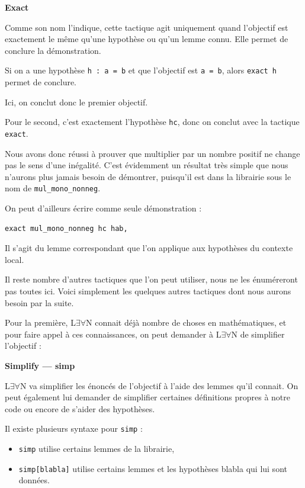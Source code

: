 \documentclass[a4paper, 11pt, twoside]{report}
\newcommand{\LEAN}{L$\exists\forall$N }
\begin{document}
\begin{tactic}
	\centerline{\bfseries Exact}
	
	Comme son nom l'indique, cette tactique agit uniquement quand l'objectif est exactement le même qu'une hypothèse ou qu'un lemme connu. Elle permet de conclure la démonstration.
	
	\tcblower
	
	Si on a une hypothèse \verb|h : a = b| et que l'objectif est \verb|a = b|, alors \verb|exact h| permet de conclure.
\end{tactic}

Ici, on conclut donc le premier objectif. 

Pour le second, c'est exactement l'hypothèse \verb|hc|, donc on conclut avec la tactique \verb|exact|.

\medskip

Nous avons donc réussi à prouver que multiplier par un nombre positif ne change pas le sens d'une inégalité. C'est évidemment un résultat très simple que nous n'aurons plus jamais besoin de démontrer, puisqu'il est dans la librairie sous le nom de \verb|mul_mono_nonneg|. 

On peut d'ailleurs écrire comme seule démonstration : 

\begin{lstlisting}
exact mul_mono_nonneg hc hab,
\end{lstlisting}

Il s'agit du lemme correspondant que l'on applique aux hypothèses du contexte local.

\medskip

Il reste nombre d'autres tactiques que l'on peut utiliser, nous ne les énuméreront pas toutes ici. Voici simplement les quelques autres tactiques dont nous aurons besoin par la suite.

\medskip

Pour la première, \LEAN connait déjà nombre de choses en mathématiques, et pour faire appel à ces connaissances, on peut demander à \LEAN de simplifier l'objectif :
\begin{tactic}
	\centerline{\bfseries Simplify --- simp}
	
	\LEAN va simplifier les énoncés de l'objectif à l'aide des lemmes qu'il connait. On peut également lui demander de simplifier certaines définitions propres à notre code ou encore de s'aider des hypothèses.
	
	\tcblower
	
	Il existe plusieurs syntaxe pour \verb|simp| :
	\begin{itemize}
		\item \verb|simp| utilise certains lemmes de la librairie,
		\item \verb|simp[blabla]| utilise certains lemmes et les hypothèses blabla qui lui sont données.
	\end{itemize}
\end{tactic}
\end{document}
